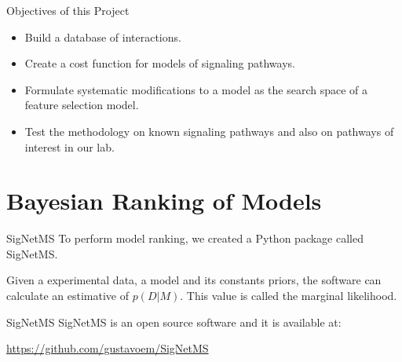 \documentclass{beamer}
\begin{document}


\begin{frame}{Objectives of this Project}
\begin{itemize}
\pause
\item{Build a database of interactions.}
\pause
\item{Create a cost function for models of signaling pathways.}
\pause
\item{Formulate systematic modifications to a model as the search space
    of a feature selection model.}
\pause
\item{Test the methodology on known signaling pathways and also on 
    pathways of interest in our lab.}
\end{itemize}
\end{frame}


\section{Bayesian Ranking of Models}

%
\begin{frame}{SigNetMS}
To perform model ranking, we created a Python package called SigNetMS.
\pause

Given a experimental data, a model and its constants priors, the 
software can calculate an estimative of $p (D | M)$. This value is 
called the marginal likelihood.
\end{frame}


\begin{frame}{SigNetMS}
SigNetMS is an open source software and it is available at:
\begin{center}
    \href{https://github.com/gustavoem/SigNetMS}{https://github.com/gustavoem/SigNetMS}
\end{center}
\end{frame}
\end{document}
